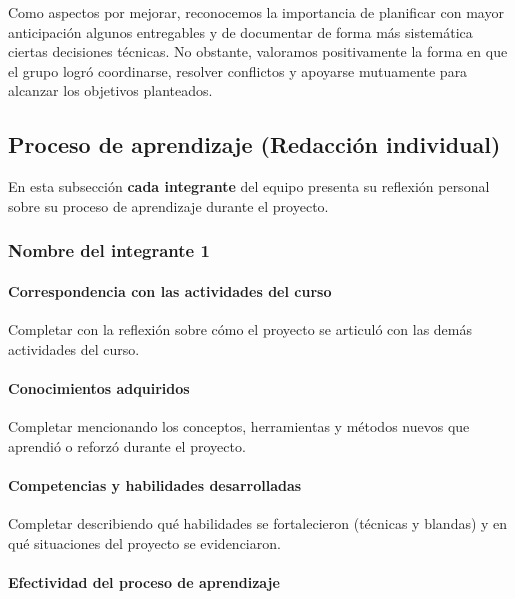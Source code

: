 \documentclass[11pt,a4paper]{article}
\begin{document}
Como aspectos por mejorar, reconocemos la importancia de planificar con mayor anticipación algunos
entregables y de documentar de forma más sistemática ciertas decisiones técnicas. No obstante, valoramos
positivamente la forma en que el grupo logró coordinarse, resolver conflictos y apoyarse mutuamente para
alcanzar los objetivos planteados.


\subsection{Proceso de aprendizaje (Redacción individual)}
\label{subsec:proceso_aprendizaje}

En esta subsección \textbf{cada integrante} del equipo presenta su reflexión
personal sobre su proceso de aprendizaje durante el proyecto.

\subsubsection*{Nombre del integrante 1}


\paragraph{Correspondencia con las actividades del curso}

Completar con la reflexión sobre cómo el proyecto se articuló con las demás
actividades del curso.

\paragraph{Conocimientos adquiridos}

Completar mencionando los conceptos, herramientas y métodos nuevos que
aprendió o reforzó durante el proyecto.

\paragraph{Competencias y habilidades desarrolladas}

Completar describiendo qué habilidades se fortalecieron (técnicas y blandas)
y en qué situaciones del proyecto se evidenciaron.

\paragraph{Efectividad del proceso de aprendizaje}
\end{document}
